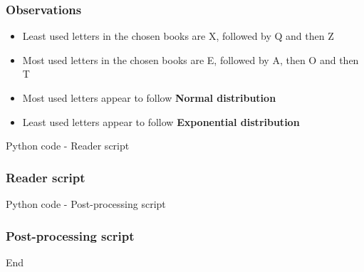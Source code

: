 \begin{frame}
    \frametitle{Observations}

    \begin{itemize}
        \item Least used letters in the chosen books are X, followed by Q and then Z
            \vspace{1cm}
        \item Most used letters in the chosen books are E, followed by A, then O and then T
            \vspace{1cm}
        \item Most used letters appear to follow \textbf{Normal distribution}
            \vspace{1cm}
        \item Least used letters appear to follow \textbf{Exponential distribution}
    \end{itemize}
\end{frame}

\begin{frame}
    \centering
     Python code - Reader script
\end{frame}

\begin{frame}
    \frametitle{Reader script}
    
\end{frame}

\begin{frame}
    \centering
     Python code - Post-processing script
\end{frame}

\begin{frame}
    \frametitle{Post-processing script}
    
\end{frame}

\begin{frame}
    \centering
     End
\end{frame}

